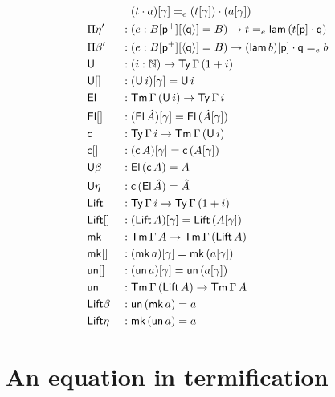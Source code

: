 \documentclass[a4paper,UKenglish]{article}
\newcommand{\ra}{\rightarrow}
\newcommand{\Ty}{\mathsf{Ty}}
\newcommand{\Tm}{\mathsf{Tm}}
\newcommand{\p}{\mathsf{p}}
\newcommand{\q}{\mathsf{q}}
\newcommand{\N}{\mathbb{N}}
\newcommand{\lam}{\mathsf{lam}}
\newcommand{\U}{\mathsf{U}}
\newcommand{\El}{\mathsf{El}}
\newcommand{\cd}{\mathsf{c}}
\newcommand{\Lift}{\mathsf{Lift}}
\newcommand{\mk}{\mathsf{mk}}
\newcommand{\un}{\mathsf{un}}
\begin{document}
\begin{alignat*}{10}
  & && \hphantom{{}:{}} (t\cdot a)[\gamma] =_e (t[\gamma])\cdot(a[\gamma]) \\
  & \Pi\eta' && : (e:B[\p^+][\langle\q\rangle] = B)\ra t =_e \lam\,(t[\p]\cdot\q) \\
  & \Pi\beta' && : (e:B[\p^+][\langle\q\rangle] = B)\ra (\lam\,b)[\p]\cdot\q =_e b \\
  & \U && : (i:\N)\ra\Ty\,\Gamma\,(1+i) \\
  & \U[] && : (\U\,i)[\gamma] = \U\,i \\  
  & \El && : \Tm\,\Gamma\,(\U\,i) \ra \Ty\,\Gamma\,i \\
  & \El[] && : (\El\,\hat{A})[\gamma] = \El\,(\hat{A}[\gamma]) \\
  & \cd && : \Ty\,\Gamma\,i\ra\Tm\,\Gamma\,(\U\,i) \\
  & \cd[] && : (\cd\,A)[\gamma] = \cd\,(A[\gamma]) \\
  & \U\beta && : \El\,(\cd\,A) = A \\
  & \U\eta && : \cd\,(\El\,\hat{A}) = \hat{A} \\
  & \Lift && : \Ty\,\Gamma\,i\ra\Ty\,\Gamma\,(1+i) \\
  & \Lift[] && : (\Lift\,A)[\gamma] = \Lift\,(A[\gamma]) \\
  & \mk && : \Tm\,\Gamma\,A \ra \Tm\,\Gamma\,(\Lift\,A) \\
  & \mk[] && : (\mk\,a)[\gamma] = \mk\,(a[\gamma]) \\
  & \un[] && : (\un\,a)[\gamma] = \un\,(a[\gamma]) \\
  & \un && : \Tm\,\Gamma\,(\Lift\,A) \ra \Tm\,\Gamma\,A \\
  & \Lift\beta && : \un\,(\mk\,a) = a \\
  & \Lift\eta && : \mk\,(\un\,a) = a
\end{alignat*}

\section{An equation in termification}
\label{app:functor}
\end{document}
